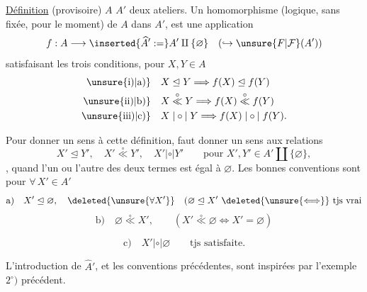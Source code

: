 
\uline{Définition} (provisoire)  $A$ $A'$ deux ateliers. Un  homomorphisme (logique, sans   fixée, pour le moment) de $A$ dans $A'$, est une application 
\[
f:A\longrightarrow\inserted{\widehat{A}':=}A'\amalg\{\varnothing\}\quad(\hookrightarrow\unsure{F|\mathcal{F}}(A'))
\]
satisfaisant les trois conditions, pour $X,Y\in A$
\[
\begin{aligned}
\text{\unsure{i)|a)}}\quad &X\trianglelefteq Y\Longrightarrow f(X)\trianglelefteq f(Y)\\
\text{\unsure{ii)|b)}}\quad &X\overset{\circ}{\ll}Y\Longrightarrow f(X)\overset{\circ}{\ll}f(Y)\\
\text{\unsure{iii)|c)}}\quad &X\mathrel{|\circ|}Y\Longrightarrow f(X)\mathrel{|\circ|}f(Y).
\end{aligned}
\]

Pour donner un sens à cette définition, faut donner un sens aux relations
\[
X'\trianglelefteq Y',\quad X'\overset{\circ}{\ll}Y',\quad X'\mathrel{|\circ|}Y'\qquad\text{pour }X',Y'\in A'\amalg\{\varnothing\},
\]
, quand l'un ou l'autre des deux termes est \deleted{$\{\varnothing\}$} égal à $\varnothing$. Les bonnes conventions sont pour $\forall\,X'\in A'$
\[
\text{a)}\quad X'\trianglelefteq\varnothing,\quad
\deleted{\unsure{\forall X'}}\quad
(\varnothing\trianglelefteq X'\ \deleted{\unsure{\Longleftrightarrow}}\ \text{tjs vrai}
\]
\[
\text{b)}\quad\varnothing\overset{\circ}{\ll}X',\qquad
(X'\overset{\circ}{\ll}\varnothing\Longleftrightarrow X'=\varnothing)
\]


\[
\text{c)}\quad X'\mathrel{|\circ|}\varnothing\qquad\text{tjs satisfaite.}
\]

L'introduction de $\widehat{A}'$, et les conventions précédentes, sont inspirées par l'exemple $2^\circ)$ précédent.

